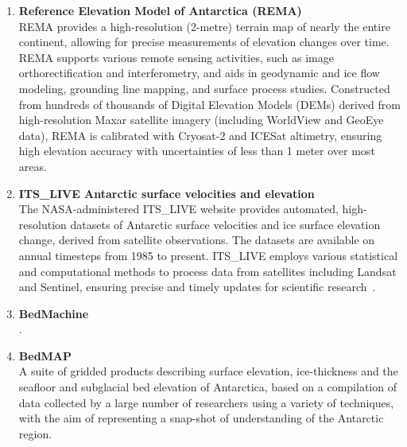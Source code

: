 \begin{enumerate}
    \item\textbf{Reference Elevation Model of Antarctica (REMA)}\\
    REMA provides a high-resolution (2-metre) terrain map of nearly the entire continent, allowing for precise measurements of elevation changes over time. REMA supports various remote sensing activities, such as image orthorectification and interferometry, and aids in geodynamic and ice flow modeling, grounding line mapping, and surface process studies. Constructed from hundreds of thousands of Digital Elevation Models (DEMs) derived from high-resolution Maxar satellite imagery (including WorldView and GeoEye data), REMA is calibrated with Cryosat-2 and ICESat altimetry, ensuring high elevation accuracy with uncertainties of less than 1 meter over most areas\cite{REMA}.

    \item\textbf{ITS\_LIVE Antarctic surface velocities and elevation}\\
    The NASA-administered ITS\_LIVE website provides automated, high-resolution datasets of Antarctic surface velocities and ice surface elevation change, derived from satellite observations. The datasets are available on annual timesteps from 1985 to present. ITS\_LIVE employs various statistical and computational methods to process data from satellites including Landsat and Sentinel, ensuring precise and timely updates for scientific research~\cite{itslive}.

    \item\textbf{BedMachine}\\
    \cite{Morlighem_2017}.

    \item\textbf{BedMAP}\\ 
    A suite of gridded products describing surface elevation, ice-thickness and the seafloor and subglacial bed elevation of Antarctica, based on a compilation of data collected by a large number of researchers using a variety of techniques, with the aim of representing a snap-shot of understanding of the Antarctic region\cite{Fretwell_2013}.


\end{enumerate}
